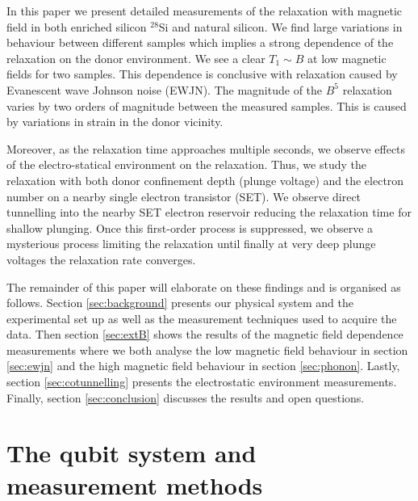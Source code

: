 \documentclass[%
 reprint,
 amsmath,amssymb,
 aps,
]{revtex4-1}
\begin{document}
In this paper we present detailed measurements of the relaxation with magnetic field in both enriched silicon $^{28}$Si and natural silicon. We find large variations in behaviour between different samples which implies a strong dependence of the relaxation on the donor environment. We see a clear $T_1\sim B$ at low magnetic fields for two samples. This dependence is conclusive with relaxation caused by Evanescent wave Johnson noise (EWJN). The magnitude of the $B^5$ relaxation varies by two orders of magnitude between the measured samples. This is caused by variations in strain in the donor vicinity. 

Moreover, as the relaxation time approaches multiple seconds, we observe effects of the electro-statical environment on the relaxation. Thus, we study the relaxation with both donor confinement depth (plunge voltage) and the electron number on a nearby single electron transistor (SET). We observe direct tunnelling into the nearby SET electron reservoir reducing the relaxation time for shallow plunging. Once this first-order process is suppressed, we observe a mysterious process limiting the relaxation until finally at very deep plunge voltages the relaxation rate converges. 

The remainder of this paper will elaborate on these findings and is organised as follows. Section \ref{sec:background} presents our physical system and the experimental set up as well as the measurement techniques used to acquire the data. Then section \ref{sec:extB} shows the results of the magnetic field dependence measurements where we both analyse the low magnetic field behaviour in section \ref{sec:ewjn} and the high magnetic field behaviour in section \ref{sec:phonon}. Lastly, section \ref{sec:cotunnelling} presents the electrostatic environment measurements. Finally, section \ref{sec:conclusion} discusses the results and open questions. 


\section{\label{sec:background} The qubit system and measurement methods}
\end{document}
